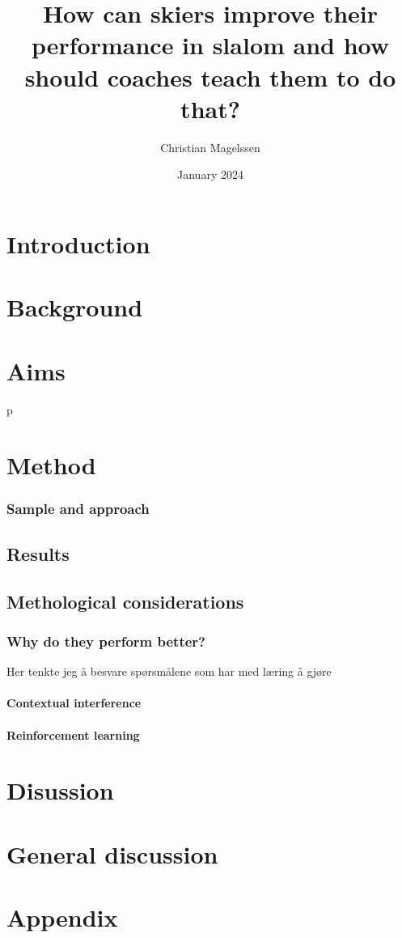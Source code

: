 \documentclass{report}
\title{How can skiers improve their performance in slalom and how should coaches teach them to do that? }
\author{Christian Magelssen}
\date{January 2024}
\begin{document}
\maketitle

\listoffigures

\chapter{Introduction}


\chapter{Background}


\chapter{Aims}



p
\chapter{Method}



\subsection{Sample and approach}


\section{Results}



\section{Methological considerations}

\subsection{Why do they perform better?}
Her tenkte jeg å besvare spørsmålene som har med læring å gjøre

\subsubsection{Contextual interference}

\subsubsection{Reinforcement learning}


\chapter{Disussion}




\chapter{General discussion}


\chapter{Appendix}


\printbibliography
\end{document}
